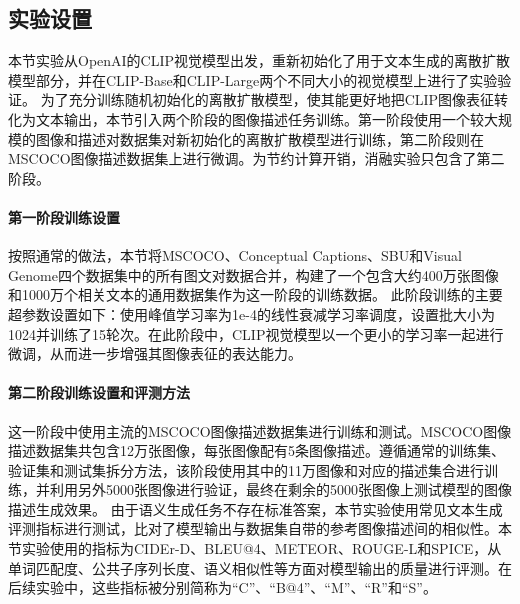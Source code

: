 \subsection{实验设置}
\label{sec:ddcap-exp-setting}
本节实验从OpenAI的CLIP视觉模型\cite{radford2021learning}出发，重新初始化了用于文本生成的离散扩散模型部分，并在CLIP-Base和CLIP-Large两个不同大小的视觉模型上进行了实验验证。
为了充分训练随机初始化的离散扩散模型，使其能更好地把CLIP图像表征转化为文本输出，本节引入两个阶段的图像描述任务训练。第一阶段使用一个较大规模的图像和描述对数据集对新初始化的离散扩散模型进行训练，第二阶段则在MSCOCO图像描述数据集上进行微调。为节约计算开销，消融实验只包含了第二阶段。

\paragraph{第一阶段训练设置} 按照通常的做法\cite{uniter, meter}，本节将MSCOCO\cite{chen2015microsoft}、Conceptual Captions\cite{sharma-etal-2018-conceptual}、SBU\cite{sbu}和Visual Genome\cite{krishna2017visual}四个数据集中的所有图文对数据合并，构建了一个包含大约400万张图像和1000万个相关文本的通用数据集作为这一阶段的训练数据。
此阶段训练的主要超参数设置如下：使用峰值学习率为1e-4的线性衰减学习率调度，设置批大小为1024并训练了15轮次。在此阶段中，CLIP视觉模型以一个更小的学习率一起进行微调，从而进一步增强其图像表征的表达能力。%

\paragraph{第二阶段训练设置和评测方法} 
这一阶段中使用主流的MSCOCO图像描述数据集进行训练和测试。MSCOCO图像描述数据集共包含12万张图像，每张图像配有5条图像描述。遵循通常的训练集、验证集和测试集拆分方法\cite{karpathy2015deep}，该阶段使用其中的11万图像和对应的描述集合进行训练，并利用另外5000张图像进行验证，最终在剩余的5000张图像上测试模型的图像描述生成效果。
由于语义生成任务不存在标准答案，本节实验使用常见文本生成评测指标进行测试，比对了模型输出与数据集自带的参考图像描述间的相似性。本节实验使用的指标为CIDEr-D\cite{cider}、BLEU@4\cite{bleu}、METEOR\cite{meteor}、ROUGE-L\cite{rouge}和SPICE\cite{spice}，从单词匹配度、公共子序列长度、语义相似性等方面对模型输出的质量进行评测。在后续实验中，这些指标被分别简称为“C”、“B@4”、“M”、“R”和“S”。

